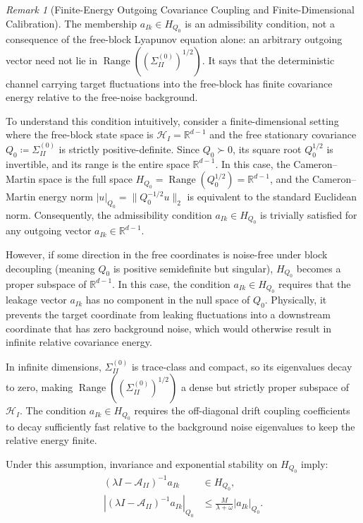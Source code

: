 \documentclass[11pt]{amsart}
\theoremstyle{plain}
\theoremstyle{definition}
\theoremstyle{remark}
\newtheorem{remark}[theorem]{Remark}
\begin{document}
\begin{remark}[Finite-Energy Outgoing Covariance Coupling and Finite-Dimensional Calibration]
  \label{rem:cm_information_flow}
  The membership $a_{Ik}\in H_{Q_0}$ is an admissibility condition,
  not a consequence of the free-block Lyapunov equation alone: an arbitrary
  outgoing vector need not lie in
  $\operatorname{Range}((\Sigma_{II}^{(0)})^{1/2})$.  It says that the
  deterministic channel carrying target fluctuations into the free-block has
  finite covariance energy relative to the free-noise background.
  
  To understand this condition intuitively, consider a finite-dimensional setting where the free-block state space is $\mathcal{H}_I = \mathbb{R}^{d-1}$ and the free stationary covariance $Q_0 \coloneqq \Sigma_{II}^{(0)}$ is strictly positive-definite. Since $Q_0 \succ 0$, its square root $Q_0^{1/2}$ is invertible, and its range is the entire space $\mathbb{R}^{d-1}$. In this case, the Cameron--Martin space is the full space $H_{Q_0} = \operatorname{Range}(Q_0^{1/2}) = \mathbb{R}^{d-1}$, and the Cameron--Martin energy norm $|u|_{Q_0} = \|Q_0^{-1/2} u\|_2$ is equivalent to the standard Euclidean norm. Consequently, the admissibility condition $a_{Ik} \in H_{Q_0}$ is trivially satisfied for any outgoing vector $a_{Ik} \in \mathbb{R}^{d-1}$.
  
  However, if some direction in the free coordinates is noise-free under block decoupling (meaning $Q_0$ is positive semidefinite but singular), $H_{Q_0}$ becomes a proper subspace of $\mathbb{R}^{d-1}$. In this case, the condition $a_{Ik} \in H_{Q_0}$ requires that the leakage vector $a_{Ik}$ has no component in the null space of $Q_0$. Physically, it prevents the target coordinate from leaking fluctuations into a downstream coordinate that has zero background noise, which would otherwise result in infinite relative covariance energy.
  
  In infinite dimensions, $\Sigma_{II}^{(0)}$ is trace-class and compact, so its eigenvalues decay to zero, making $\operatorname{Range}((\Sigma_{II}^{(0)})^{1/2})$ a dense but strictly proper subspace of $\mathcal{H}_I$. The condition $a_{Ik} \in H_{Q_0}$ requires the off-diagonal drift coupling coefficients to decay sufficiently fast relative to the background noise eigenvalues to keep the relative energy finite.
  
  Under this assumption, invariance and exponential stability on $H_{Q_0}$ imply:
  \begin{equation}
  \begin{aligned}
    (\lambda I-\mathcal{A}_{II})^{-1}a_{Ik}
       &\in H_{Q_0},\\
    |(\lambda I-\mathcal{A}_{II})^{-1}a_{Ik}|_{Q_0}
       &\le \frac{M}{\lambda+\omega}|a_{Ik}|_{Q_0}.
  \end{aligned}
  \end{equation}
\end{remark}
\end{document}
